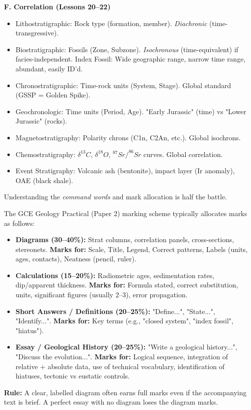 \documentclass[11pt]{article}
\newcommand{\cle}[1]{{\popxbold\color{popdark}#1}}
\newcounter{popsec}
\newcounter{popsub}
\newcommand{\courssub}[1]{%
  \stepcounter{popsub}%
  \par\vspace{9pt}\noindent{\popxbold\fontsize{11.5}{13}\selectfont\color{popink}{\color{poporange}\thepopsec.\thepopsub}\hspace{6pt}#1}\par\nopagebreak\vspace{4pt}
}
\begin{document}
\begin{aretenir}
\textbf{F. Correlation (Lessons 20--22)}
\begin{itemize}
    \item \cle{Lithostratigraphic}: Rock type (formation, member). \emph{Diachronic} (time-transgressive).
    \item \cle{Biostratigraphic}: Fossils (Zone, Subzone). \emph{Isochronous} (time-equivalent) if facies-independent. \cle{Index Fossil}: Wide geographic range, narrow time range, abundant, easily ID'd.
    \item \cle{Chronostratigraphic}: Time-rock units (System, Stage). Global standard (GSSP = Golden Spike).
    \item \cle{Geochronologic}: Time units (Period, Age). "Early Jurassic" (time) vs "Lower Jurassic" (rocks).
    \item \cle{Magnetostratigraphy}: Polarity chrons (C1n, C2An, etc.). Global isochrons.
    \item \cle{Chemostratigraphy}: $\delta^{13}C$, $\delta^{18}O$, $^{87}Sr/^{86}Sr$ curves. Global correlation.
    \item \cle{Event Stratigraphy}: Volcanic ash (bentonite), impact layer (Ir anomaly), OAE (black shale).
\end{itemize}
\end{aretenir}

\courssub{Deconstructing GCE Question Types}

Understanding the \emph{command words} and mark allocation is half the battle.

\begin{propriete}
The GCE Geology Practical (Paper 2) marking scheme typically allocates marks as follows:
\begin{itemize}
    \item \textbf{Diagrams (30--40\%):} Strat columns, correlation panels, cross-sections, stereonets. \textbf{Marks for:} Scale, Title, Legend, Correct patterns, Labels (units, ages, contacts), Neatness (pencil, ruler).
    \item \textbf{Calculations (15--20\%):} Radiometric ages, sedimentation rates, dip/apparent thickness. \textbf{Marks for:} Formula stated, correct substitution, units, significant figures (usually 2--3), error propagation.
    \item \textbf{Short Answers / Definitions (20--25\%):} "Define...", "State...", "Identify...". \textbf{Marks for:} Key terms (e.g., "closed system", "index fossil", "hiatus").
    \item \textbf{Essay / Geological History (20--25\%):} "Write a geological history...", "Discuss the evolution...". \textbf{Marks for:} Logical sequence, integration of relative + absolute data, use of technical vocabulary, identification of hiatuses, tectonic vs eustatic controls.
\end{itemize}
\textbf{Rule:} A clear, labelled diagram often earns full marks even if the accompanying text is brief. A perfect essay with no diagram loses the diagram marks.
\end{propriete}
\end{document}
